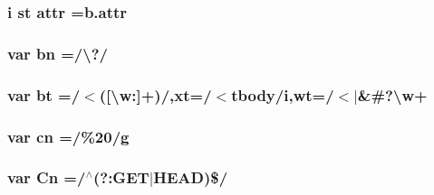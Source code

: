 \hypertarget{jquery-1_89_81_8min_8js_a69c08fa54182d9901222ec75859626f8}{
\subsubsection[{attr}]{ {\bf i} {\bf st} attr =b.\-attr}}\label{jquery-1_89_81_8min_8js_a69c08fa54182d9901222ec75859626f8}
\hypertarget{jquery-1_89_81_8min_8js_ac1a6899002e156376de301d5f5fa36d8}{
\subsubsection[{bn}]{\setlength{\rightskip}{0pt plus 5cm}var bn =/\textbackslash{}?/}}\label{jquery-1_89_81_8min_8js_ac1a6899002e156376de301d5f5fa36d8}
\hypertarget{jquery-1_89_81_8min_8js_aa0082733b0e56ee7ac500fefc279209c}{
\subsubsection[{bt}]{\setlength{\rightskip}{0pt plus 5cm}var bt =/$<$(\mbox{[}\textbackslash{}w\-:\mbox{]}+)/,{\bf xt}=/$<${\bf tbody}/{\bf i},{\bf wt}=/$<$$\vert$\&\#?\textbackslash{}{\bf w}+}}\label{jquery-1_89_81_8min_8js_aa0082733b0e56ee7ac500fefc279209c}
\hypertarget{jquery-1_89_81_8min_8js_a43c2bda2537661fb64e62fdfdcea1560}{
\subsubsection[{cn}]{\setlength{\rightskip}{0pt plus 5cm}var cn =/\%20/{\bf g}}}\label{jquery-1_89_81_8min_8js_a43c2bda2537661fb64e62fdfdcea1560}
\hypertarget{jquery-1_89_81_8min_8js_ab832fcb3f80f807f0b65d1e3b4904de8}{
\subsubsection[{Cn}]{\setlength{\rightskip}{0pt plus 5cm}var Cn =/$^\wedge$(?\-:G\-E\-T$\vert$H\-E\-A\-D)\$/}}\label{jquery-1_89_81_8min_8js_ab832fcb3f80f807f0b65d1e3b4904de8}
